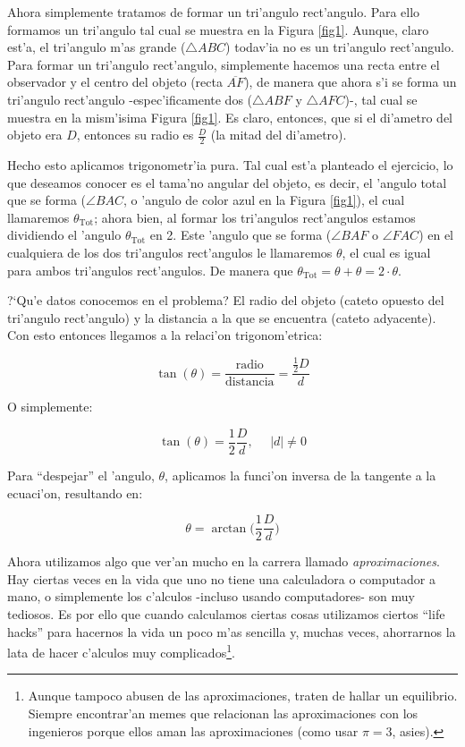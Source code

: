 \documentclass{article}
\begin{document}
\begin{enumerate} [a)]
Ahora simplemente tratamos de formar un tri'angulo rect'angulo. Para ello formamos un tri'angulo tal cual se muestra en la Figura \ref{fig1}. Aunque, claro est'a, el tri'angulo m'as grande ($\bigtriangleup ABC$) todav'ia no es un tri'angulo rect'angulo. Para formar un tri'angulo rect'angulo, simplemente hacemos una recta entre el observador y el centro del objeto (recta $\overline{AF}$), de manera que ahora s'i se forma un tri'angulo rect'angulo -espec'ificamente dos ($\bigtriangleup ABF$ y $\bigtriangleup AFC$)-, tal cual se muestra en la mism'isima Figura \ref{fig1}. Es claro, entonces, que si el di'ametro del objeto era $D$, entonces su radio es $\frac{D}{2}$ (la mitad del di'ametro).

Hecho esto aplicamos trigonometr'ia pura. Tal cual est'a planteado el ejercicio, lo que deseamos conocer es el tama'no angular del objeto, es decir, el 'angulo total que se forma ($\angle BAC$, o 'angulo de color azul en la Figura \ref{fig1}), el cual llamaremos $\theta_{\text{Tot}}$; ahora bien, al formar los tri'angulos rect'angulos estamos dividiendo el 'angulo $\theta_{\text{Tot}}$ en 2. Este 'angulo que se forma ($\angle BAF$ o $\angle FAC$) en el cualquiera de los dos tri'angulos rect'angulos le llamaremos $\theta$, el cual es igual para ambos tri'angulos rect'angulos. De manera que $\theta_{\text{Tot}} = \theta + \theta = 2 \cdot \theta$. 

?`Qu'e datos conocemos en el problema? El radio del objeto (cateto opuesto del tri'angulo rect'angulo) y la distancia a la que se encuentra (cateto adyacente). Con esto entonces llegamos a la relaci'on trigonom'etrica:

\begin{equation*}
\tan ( \theta ) = \frac{\text{radio}}{\text{distancia}} = \frac{\frac{1}{2}D}{d}
\end{equation*}

O simplemente:

\begin{equation}
\tan ( \theta ) = \frac{1}{2} \frac{D}{d}, \ \ \ \ \ \ |d| \neq 0 
\end{equation}

Para ``despejar'' el 'angulo, $\theta$, aplicamos la funci'on inversa de la tangente a la ecuaci'on, resultando en:

\begin{equation} \label{eq_arctan}
\theta = \arctan \Big( \frac{1}{2} \frac{D}{d} \Big)
\end{equation}

Ahora utilizamos algo que ver'an mucho en la carrera llamado \emph{aproximaciones}. Hay ciertas veces en la vida que uno no tiene una calculadora o computador a mano, o simplemente los c'alculos -incluso usando computadores- son muy tediosos. Es por ello que cuando calculamos ciertas cosas utilizamos ciertos ``life hacks'' para hacernos la vida un poco m'as sencilla y, muchas veces, ahorrarnos la lata de hacer c'alculos muy complicados\footnote{Aunque tampoco abusen de las aproximaciones, traten de hallar un equilibrio. Siempre encontrar'an memes que relacionan las aproximaciones con los ingenieros porque ellos aman las aproximaciones (como usar $\pi = 3$, asies).}.


\end{enumerate}
\end{document}
